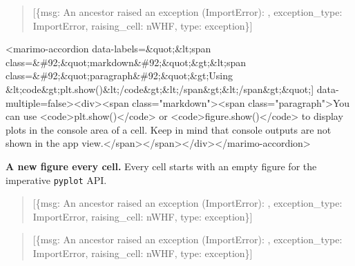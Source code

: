 \documentclass[
  letterpaper,
  DIV=11,
  numbers=noendperiod]{scrartcl}
\begin{document}
\begin{quote}
{[}\{\textquotesingle msg\textquotesingle: \textquotesingle An ancestor
raised an exception (ImportError): \textquotesingle,
\textquotesingle exception\_type\textquotesingle:
\textquotesingle ImportError\textquotesingle,
\textquotesingle raising\_cell\textquotesingle:
\textquotesingle nWHF\textquotesingle,
\textquotesingle type\textquotesingle:
\textquotesingle exception\textquotesingle\}{]}
\end{quote}

\textless marimo-accordion
data-labels=\textquotesingle{[}\&quot;\&lt;span
class=\&\#92;\&quot;markdown\&\#92;\&quot;\&gt;\&lt;span
class=\&\#92;\&quot;paragraph\&\#92;\&quot;\&gt;Using
\&lt;code\&gt;plt.show()\&lt;/code\&gt;\&lt;/span\&gt;\&lt;/span\&gt;\&quot;{]}\textquotesingle{}
data-multiple=\textquotesingle false\textquotesingle\textgreater\textless div\textgreater\textless span
class="markdown"\textgreater\textless span
class="paragraph"\textgreater You can use
\textless code\textgreater plt.show()\textless/code\textgreater{} or
\textless code\textgreater figure.show()\textless/code\textgreater{} to
display plots in the console area of a cell. Keep in mind that console
outputs are not shown in the app
view.\textless/span\textgreater\textless/span\textgreater\textless/div\textgreater\textless/marimo-accordion\textgreater{}

\textbf{A new figure every cell.} Every cell starts with an empty figure
for the imperative \texttt{pyplot} API.

\begin{quote}
{[}\{\textquotesingle msg\textquotesingle: \textquotesingle An ancestor
raised an exception (ImportError): \textquotesingle,
\textquotesingle exception\_type\textquotesingle:
\textquotesingle ImportError\textquotesingle,
\textquotesingle raising\_cell\textquotesingle:
\textquotesingle nWHF\textquotesingle,
\textquotesingle type\textquotesingle:
\textquotesingle exception\textquotesingle\}{]}
\end{quote}

\begin{quote}
{[}\{\textquotesingle msg\textquotesingle: \textquotesingle An ancestor
raised an exception (ImportError): \textquotesingle,
\textquotesingle exception\_type\textquotesingle:
\textquotesingle ImportError\textquotesingle,
\textquotesingle raising\_cell\textquotesingle:
\textquotesingle nWHF\textquotesingle,
\textquotesingle type\textquotesingle:
\textquotesingle exception\textquotesingle\}{]}
\end{quote}
\end{document}

